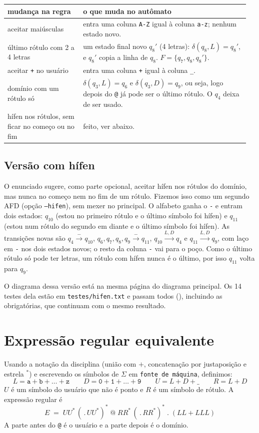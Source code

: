 \documentclass[11pt,a4paper]{article}
\newcommand{\s}[1]{\texttt{#1}}
\newcommand{\q}[1]{$q_{#1}$}
\begin{document}
{\small
\begin{tabular}{@{}p{0.30\linewidth} p{0.66\linewidth}@{}}
\toprule
mudança na regra & o que muda no autômato \\
\midrule
aceitar maiúsculas & entra uma coluna \s{A-Z} igual à coluna \s{a-z}; nenhum estado novo. \\
último rótulo com 2 a 4 letras & um estado final novo $q_8'$ (4 letras): $\delta(q_8, L) = q_8'$, e $q_8'$ copia a linha de \q8. $F = \{q_7, q_8, q_8'\}$. \\
aceitar \s{+} no usuário & entra uma coluna \s{+} igual à coluna \s{\_}. \\
domínio com um rótulo só & $\delta(q_3, L) = q_6$ e $\delta(q_3, D) = q_9$, ou seja, logo depois do \s{@} já pode ser o último rótulo. O \q4 deixa de ser usado. \\
hífen nos rótulos, sem ficar no começo ou no fim & feito, ver abaixo. \\
\bottomrule
\end{tabular}}

\subsection{Versão com hífen}
O enunciado sugere, como parte opcional, aceitar hífen nos rótulos do domínio, mas nunca no começo nem no fim de
um rótulo. Fizemos isso como um segundo AFD (opção \s{--hifen}), sem mexer no principal. O alfabeto ganha o \s{-}
e entram dois estados: $q_{10}$ (estou no primeiro rótulo e o último símbolo foi hífen) e $q_{11}$ (estou num rótulo
do segundo em diante e o último símbolo foi hífen). As transições novas são $q_4 \xrightarrow{-} q_{10}$,
$q_6, q_7, q_8, q_9 \xrightarrow{-} q_{11}$, $q_{10} \xrightarrow{L,D} q_4$ e $q_{11} \xrightarrow{L,D} q_9$, com laço em
\s{-} nos dois estados novos; o resto da coluna \s{-} vai para o poço. Como o último rótulo só pode ter letras, um
rótulo com hífen nunca é o último, por isso $q_{11}$ volta para \q9.

O diagrama dessa versão está na mesma página do diagrama principal. Os 14 testes dela estão em
\s{testes/hifen.txt} e passam todos (\TestesHifenTotal), incluindo as obrigatórias, que continuam com o mesmo resultado.

\section{Expressão regular equivalente}

Usando a notação da disciplina (união com $+$, concatenação por justaposição e estrela $^*$) e escrevendo os
símbolos de $\Sigma$ em \s{fonte\ de\ máquina}, definimos:
\[
L = \s{a}+\s{b}+\dots+\s{z} \qquad D = \s{0}+\s{1}+\dots+\s{9} \qquad
U = L + D + \s{\_} \qquad R = L + D
\]
$U$ é um símbolo do usuário que não é ponto e $R$ é um símbolo de rótulo. A expressão regular é
\[
E \;=\; U U^* \,(\,\s{.}\, U U^*)^* \;\s{@}\; R R^* \,(\,\s{.}\, R R^*)^* \;\s{.}\; (LL + LLL)
\]
A parte antes do \s{@} é o usuário e a parte depois é o domínio.
\end{document}
